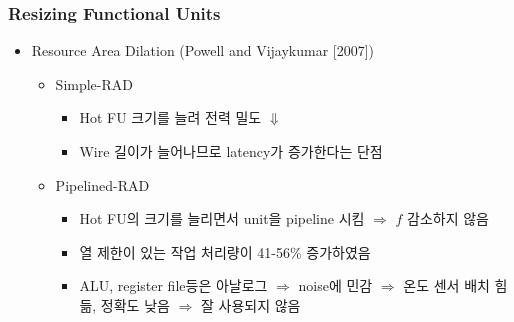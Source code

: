 \subsubsection*{Resizing Functional Units}
\begin{itemize}
    \item Resource Area Dilation (Powell and Vijaykumar [2007])
    \begin{itemize}
        \item Simple-RAD
        \begin{itemize}
            \item Hot FU 크기를 늘려 전력 밀도 $\Downarrow$
            \item Wire 길이가 늘어나므로 latency가 증가한다는 단점
        \end{itemize}
        \item Pipelined-RAD
        \begin{itemize}
            \item Hot FU의 크기를 늘리면서 unit을 pipeline 시킴 $\Rightarrow$ $f$ 감소하지 않음
            \item 열 제한이 있는 작업 처리량이 41-56\% 증가하였음
            \item ALU, register file등은 아날로그 $\Rightarrow$ noise에 민감
                $\Rightarrow$ 온도 센서 배치 힘듦, 정확도 낮음 $\Rightarrow$ 잘 사용되지 않음
        \end{itemize}
    \end{itemize}
\end{itemize}

